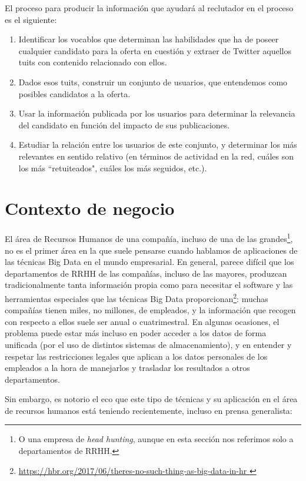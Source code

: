 El proceso para producir la información que ayudará al reclutador en el proceso es el siguiente:
\begin{enumerate}
\item Identificar los vocablos que determinan las habilidades que ha de poseer cualquier candidato
para la oferta en cuestión y extraer de Twitter aquellos tuits con contenido relacionado con ellos.
\item Dados esos tuits, construir un conjunto de usuarios, que entendemos como posibles candidatos 
a la oferta.
\item Usar la información publicada por los usuarios para determinar la relevancia del candidato
en función del impacto de sus publicaciones.
\item Estudiar la relación entre los usuarios de este conjunto, y determinar los más relevantes en sentido
relativo (en términos de actividad en la red, cuáles son los más ``retuiteados", cuáles los más seguidos, etc.).
\end{enumerate}



\section{Contexto de negocio}
El área de Recursos Humanos de una compañía, incluso de una de las grandes\footnote{O
una empresa de {\em head hunting}, aunque en esta sección nos referimos solo a departamentos
de RRHH.}, no es el primer área 
en la que suele pensarse cuando hablamos de aplicaciones de las técnicas Big Data en el mundo
empresarial. En general,
parece difícil que los departamentos de RRHH de las compañías,  incluso de las mayores, produzcan
tradicionalmente tanta información propia como para necesitar el software y las herramientas especiales
que las técnicas Big Data proporcionan\footnote{\url{https://hbr.org/2017/06/theres-no-such-thing-as-big-data-in-hr }}:
muchas compañías tienen miles, no millones, de empleados, y la información que recogen con respecto a ellos suele ser anual o cuatrimestral. En algunas ocasiones, el problema puede estar más incluso en
poder acceder a los datos de forma unificada (por el uso de distintos sistemas de almacenamiento),
y en entender y respetar las restricciones legales que aplican a los datos personales de los empleados
a la hora de manejarlos y trasladar los resultados a otros departamentos.

Sin embargo, es notorio el eco que este tipo de técnicas y su aplicación en el área de 
recursos humanos está teniendo recientemente, incluso en prensa generalista:


